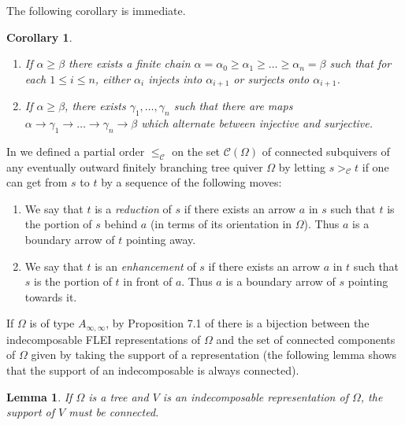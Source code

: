 \documentclass{article}
\newtheorem{lemma}{Lemma}[section]
\newtheorem{corollary}{Corollary}[section]
\begin{document}
The following corollary is immediate. 

\begin{corollary}\label{cor: all inj and surj}
\
    \begin{enumerate}
    
    \item If $\alpha \geq \beta$ there exists a finite chain $\alpha = \alpha_0 \geq \alpha_1 \geq \ldots \geq \alpha_n = \beta$ such that for each $1 \leq i \leq n$, either $\alpha_i$ injects  into $\alpha_{i + 1}$ or surjects onto $\alpha_{i + 1}$.
    
    \item If $\alpha \geq \beta$, there exists $\gamma_1, \ldots, \gamma_n$ such that there are maps $\alpha \to \gamma_1 \to \ldots \to \gamma_n \to \beta$ which alternate between injective and surjective. 
    
    \end{enumerate}
\end{corollary}

In \cite{gallup2022decompositions} we defined a partial order $\leq_{\mathcal{C}}$ on the set $\mathcal{C}(\Omega)$ of connected subquivers of any eventually outward finitely branching tree quiver $\Omega$ by letting $s >_{\mathcal{C}} t$ if one can get from $s$ to $t$ by a sequence of the following moves:
\begin{enumerate}

    \item We say that $t$ is a \emph{reduction} of $s$ if there exists an arrow $a$ in $s$ such that $t$ is the portion of $s$ behind $a$ (in terms of its orientation in $\Omega$). Thus $a$ is a boundary arrow of $t$ pointing away.
    
    \item We say that $t$ is an \emph{enhancement} of $s$ if there exists an arrow $a$ in $t$ such that $s$ is the portion of $t$ in front of $a$. Thus $a$ is a boundary arrow of $s$ pointing towards it.

\end{enumerate}

If $\Omega$ is of type $A_{\infty, \infty}$, by Proposition 7.1 of \cite{gallup2022decompositions} there is a bijection between the indecomposable FLEI representations of $\Omega$ and the set of connected components of $\Omega$ given by taking the support of a representation (the following lemma shows that the support of an indecomposable is always connected). 

\begin{lemma}\label{lem: support of indecomposable is connected}
If $\Omega$ is a tree and $V$ is an indecomposable representation of $\Omega$, the support of $V$ must be connected. 
\end{lemma}
\end{document}
